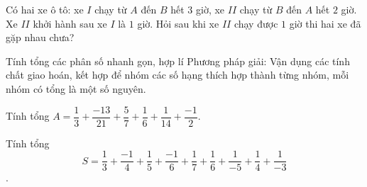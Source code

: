 \begin{vd}%
	Có hai xe ô tô: xe $I$ chạy từ $A$ đến $B$ hết $3$ giờ, xe $II$ chạy từ $B$ đến $A$ hết $2$ giờ. Xe $II$ khởi hành sau xe $I$ là $1$ giờ. Hỏi sau khi xe $II$ chạy được $1$ giờ thi hai xe đã gặp nhau chưa?
\end{vd}

\begin{dang}{Tính tổng các phân số nhanh gọn, hợp lí}
	Phương pháp giải: Vận dụng các tính chất giao hoán, kết hợp để nhóm các số hạng thích hợp thành từng nhóm, mỗi nhóm có tổng là một số nguyên.
\end{dang}

\begin{vd}%
	Tính tổng $A=\dfrac{1}{3}+\dfrac{-13}{21}+\dfrac{5}{7}+\dfrac{1}{6}+\dfrac{1}{14}+\dfrac{-1}{2}$.
\end{vd}

\begin{vd}%
	Tính tổng $$S=\dfrac{1}{3}+\dfrac{-1}{4}+\dfrac{1}{5}+\dfrac{-1}{6}+\dfrac{1}{7}+\dfrac{1}{6}+\dfrac{1}{-5}+\dfrac{1}{4}+\dfrac{1}{-3}$$.
	
\end{vd}

